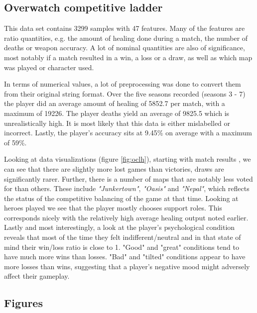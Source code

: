 \documentclass{article}
\begin{document}
\subsection*{Overwatch competitive ladder}
This data set contains 3299 samples with 47 features.
Many of the features are ratio quantities, e.g. the amount of healing done during a match, the number of deaths or weapon accuracy.
A lot of nominal quantities are also of significance, most notably if a match resulted in a win, a loss or a draw, as well as which map was played or character used.

In terms of numerical values, a lot of preprocessing was done to convert them from their original string format.
Over the five seasons recorded (seasons 3 - 7) the player did an average amount of healing of 5852.7 per match, with a maximum of 19226.
The player deaths yield an average of 9825.5 which is unrealistically high.
It is most likely that this data is either mislabelled or incorrect.
Lastly, the player's accuracy sits at 9.45\% on average with a maximum of 59\%.

Looking at data visualizations (figure \ref{fig:oclh}), starting with match results , we can see that there are slightly more lost games than victories, draws are significantly rarer.
Further, there is a number of maps that are notably less voted for than others.
These include \textit{"Junkertown"}, \textit{"Oasis"} and \textit{"Nepal"}, which reflects the status of the competitive balancing of the game at that time.
Looking at heroes played we see that the player mostly chooses support roles.
This corresponds nicely with the relatively high average healing output noted earlier.
Lastly and most interestingly, a look at the player's psychological condition reveals that most of the time they felt indifferent/neutral and in that state of mind their win/loss ratio is close to 1.
"Good" and "great" conditions tend to have much more wins than losses.
"Bad" and "tilted" conditions appear to have more losses than wins, suggesting that a player's negative mood might adversely affect their gameplay.

\subsection*{Figures}

\end{document}

